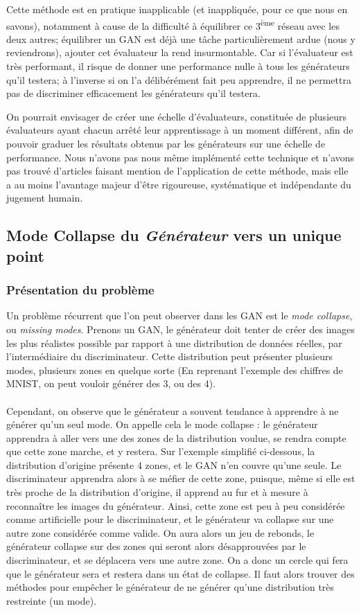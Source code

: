 Cette méthode est en pratique inapplicable (et inappliquée, pour ce que nous en savons), notamment à cause de la difficulté à équilibrer ce 3\textsuperscript{ème} réseau avec les deux autres; équilibrer un GAN est déjà une tâche particulièrement ardue (nous y reviendrons), ajouter cet évaluateur la rend insurmontable. Car si l'évaluateur est très performant, il risque de donner une performance nulle à tous les générateurs qu'il testera; à l'inverse si on l'a délibérément fait peu apprendre, il ne permettra pas de discriminer efficacement les générateurs qu'il testera.

On pourrait envisager de créer une échelle d'évaluateurs, constituée de plusieurs évaluateurs ayant chacun arrêté leur apprentissage à un moment différent, afin de pouvoir graduer les résultats obtenus par les générateurs sur une échelle de performance. Nous n'avons pas nous même implémenté cette technique et n'avons pas trouvé d'articles faisant mention de l'application de cette méthode, mais elle a au moins l'avantage majeur d'être rigoureuse, systématique et indépendante du jugement humain.

\subsection{Mode Collapse du \textit{Générateur} vers un unique point}
\subsubsection{Présentation du problème}

Un problème récurrent que l'on peut observer dans les GAN est le \textit{mode collapse}, ou \textit{missing modes}. Prenons un GAN, le générateur doit tenter de créer des images les plus réalistes possible par rapport à une distribution de données réelles, par l'intermédiaire du discriminateur. Cette distribution peut présenter plusieurs modes, plusieurs zones en quelque sorte (En reprenant l'exemple des chiffres de MNIST, on peut vouloir générer des 3, ou des 4). 
\\ \\
Cependant, on observe que le générateur a souvent tendance à apprendre à ne générer qu'un seul mode. On appelle cela le mode collapse : le générateur apprendra à aller vers une des zones de la distribution voulue, se rendra compte que cette zone marche, et y restera. 
Sur l'exemple simplifié ci-dessous, la distribution d'origine présente 4 zones, et le GAN n'en couvre qu'une seule.
Le discriminateur apprendra alors à se méfier de cette zone, puisque, même si elle est très proche de la distribution d'origine, il apprend au fur et à mesure à reconnaître les images du générateur. Ainsi, cette zone est peu à peu considérée comme artificielle pour le discriminateur, et le générateur va collapse sur une autre zone considérée comme valide. On aura alors un jeu de rebonds, le générateur collapse sur des zones qui seront alors désapprouvées par le discriminateur, et se déplacera vers une autre zone. 
On a donc un cercle qui fera que le générateur sera et restera dans un état de collapse. 
Il faut alors trouver des méthodes pour empêcher le générateur de ne générer qu'une distribution très restreinte (un mode).

